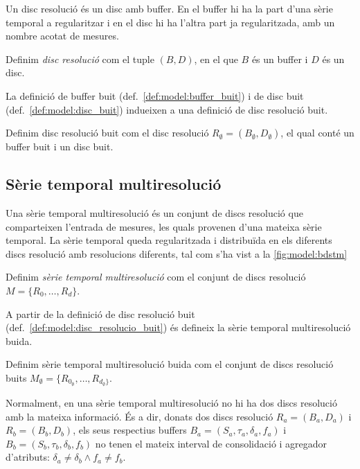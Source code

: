 Un disc resolució és un disc amb buffer. En el buffer hi ha la part d'una sèrie temporal a regularitzar i en el disc hi ha l'altra part ja regularitzada, amb un nombre acotat de mesures. 

\begin{definition}
  Definim \emph{disc resolució} com el tuple $(B,D)$, en el que $B$
  és un buffer i $D$ és un disc.
\end{definition}
 
La definició de buffer buit (def.~\ref{def:model:buffer_buit}) i de disc buit (def.~\ref{def:model:disc_buit}) indueixen a una definició de disc resolució buit. 

\begin{definition}\label{def:model:disc_resolucio_buit}
  Definim disc resolució buit com el disc resolució $R_{\emptyset}
  = (B_{\emptyset},D_{\emptyset})$, el qual conté un buffer buit i un
  disc buit.
\end{definition}


\subsection{Sèrie temporal multiresolució}

Una sèrie temporal multiresolució és un conjunt de discs resolució que
comparteixen l'entrada de mesures, les quals provenen d'una mateixa
sèrie temporal. La sèrie temporal queda regularitzada i distribuïda en
els diferents discs resolució amb resolucions diferents, tal com s'ha
vist a la \autoref{fig:model:bdstm}


\begin{definition}
  Definim \emph{sèrie temporal multiresolució} com el conjunt de discs
  resolució $M=\{R_0,\dotsc,R_d\}$.
\end{definition}

A partir de la definició de disc resolució buit
(def.~\ref{def:model:disc_resolucio_buit}) és defineix la sèrie
temporal multiresolució buida.
 
\begin{definition}\label{def:model:st_multiresolucio_buit}
  Definim sèrie temporal multiresolució buida com el conjunt de discs
  resolució buits
  $M_{\emptyset}=\{R_{0_{\emptyset}},\dotsc,R_{d_{\emptyset}\}}$.
\end{definition}

Normalment, en una sèrie temporal multiresolució no hi ha dos discs
resolució amb la mateixa informació. És a dir, donats dos discs
resolució $R_a = (B_a, D_a)$ i $R_b = (B_b, D_b)$, els seus respectius
buffers $B_a=(S_a,\tau_a,\delta_a,f_a)$ i
$B_b=(S_b,\tau_b,\delta_b,f_b)$ no tenen el mateix interval de
consolidació i agregador d'atributs: $\delta_a \neq \delta_b \wedge
f_a \neq f_b$.




